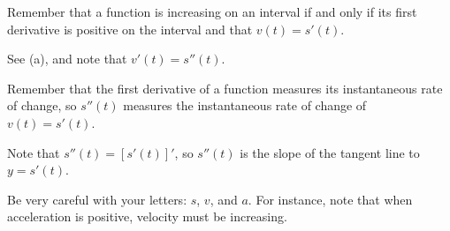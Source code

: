 \begin{bighint}
\ba
	\item Remember that a function is increasing on an interval if and only if its first derivative is positive on the interval and that $v(t) = s'(t)$.
	\item See (a), and note that $v'(t) = s''(t)$.
	\item Remember that the first derivative of a function measures its instantaneous rate of change, so $s''(t)$ measures the instantaneous rate of change of $v(t) = s'(t)$.
	\item Note that $s''(t) = [s'(t)]'$, so $s''(t)$ is the slope of the tangent line to $y = s'(t)$.
	\item Be very careful with your letters:  $s$, $v$, and $a$.  For instance, note that when acceleration is positive, velocity must be increasing.
\ea
\end{bighint}

